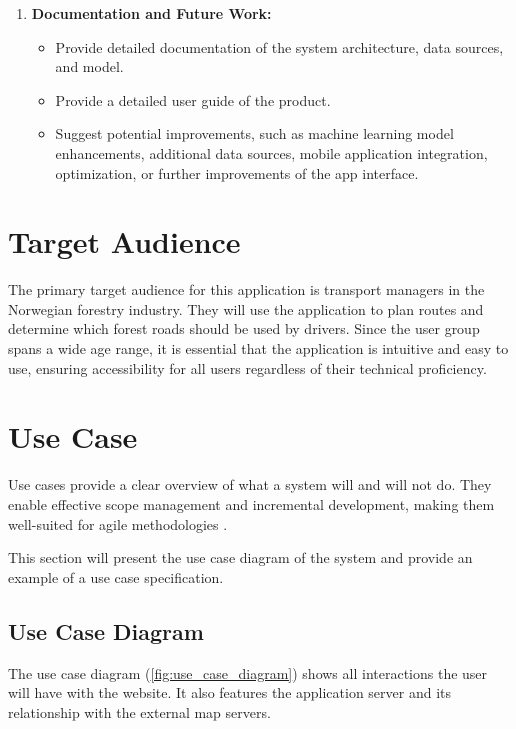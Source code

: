 \begin{enumerate}
    \item \textbf{Documentation and Future Work:}
    \begin{itemize}
        \item Provide detailed documentation of the system architecture, data sources, and model.
        \item Provide a detailed user guide of the product.
        \item Suggest potential improvements, such as machine learning model enhancements, additional data sources, mobile application integration, optimization, or further improvements of the app interface.
    \end{itemize}
\end{enumerate}

\section{Target Audience}

The primary target audience for this application is transport managers in the Norwegian forestry industry. They will use the application to plan routes and determine which forest roads should be used by drivers. Since the user group spans a wide age range, it is essential that the application is intuitive and easy to use, ensuring accessibility for all users regardless of their technical proficiency.

\section{Use Case}

Use cases provide a clear overview of what a system will and will not do. They enable effective scope management and incremental development, making them well-suited for agile methodologies \cite{jacobson_use_case}. 

This section will present the use case diagram of the system and provide an example of a use case specification.

\subsection{Use Case Diagram}
The use case diagram (\autoref{fig:use_case_diagram}) shows all interactions the user will have with the website. It also features the application server and its relationship with the external map servers.



